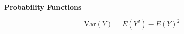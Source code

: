 \documentclass[12pt]{article}
\begin{document}
\newpage
{\LARGE
\begin{center}
\textbf{Probability Functions}\\
\end{center}
\begin{framed}
\[ \mbox{Var}(Y) = E(Y^2) - E(Y)^2  \]
\end{framed}
}
\end{document}
